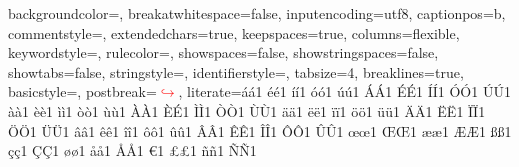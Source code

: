 
\lstset
{ 
  backgroundcolor=\color{white},        %
  breakatwhitespace=false,              %
  inputencoding=utf8,                   %
  captionpos=b,                         %
  commentstyle=\color{darkgreen},       %
  extendedchars=true,                   %
  keepspaces=true,                      %
  columns=flexible,                     %
  keywordstyle=\color{darkorange},      %
  rulecolor=\color{black},              %
  showspaces=false,                     %
  showstringspaces=false,               %
  showtabs=false,                       %
  stringstyle=\color{darkgreen},        %
  identifierstyle=\color{blue},         %
  tabsize=4,	                        %
  breaklines=true,                      %
  basicstyle=\footnotesize\ttfamily,    %
  postbreak=\mbox{\textcolor{red}{$\hookrightarrow$}\space}, %
  literate={á}{{\'a}}1 {é}{{\'e}}1 {í}{{\'i}}1 {ó}{{\'o}}1 {ú}{{\'u}}1 %
  {Á}{{\'A}}1 {É}{{\'E}}1 {Í}{{\'I}}1 {Ó}{{\'O}}1 {Ú}{{\'U}}1
  {à}{{\`a}}1 {è}{{\`e}}1 {ì}{{\`i}}1 {ò}{{\`o}}1 {ù}{{\`u}}1
  {À}{{\`A}}1 {È}{{\'E}}1 {Ì}{{\`I}}1 {Ò}{{\`O}}1 {Ù}{{\`U}}1
  {ä}{{\"a}}1 {ë}{{\"e}}1 {ï}{{\"i}}1 {ö}{{\"o}}1 {ü}{{\"u}}1
  {Ä}{{\"A}}1 {Ë}{{\"E}}1 {Ï}{{\"I}}1 {Ö}{{\"O}}1 {Ü}{{\"U}}1
  {â}{{\^a}}1 {ê}{{\^e}}1 {î}{{\^i}}1 {ô}{{\^o}}1 {û}{{\^u}}1
  {Â}{{\^A}}1 {Ê}{{\^E}}1 {Î}{{\^I}}1 {Ô}{{\^O}}1 {Û}{{\^U}}1
  {œ}{{\oe}}1 {Œ}{{\OE}}1 {æ}{{\ae}}1 {Æ}{{\AE}}1 {ß}{{\ss}}1
  {ç}{{\c c}}1 {Ç}{{\c C}}1 {ø}{{\o}}1 {å}{{\r a}}1 {Å}{{\r A}}1
  {€}{{\EUR}}1 {£}{{\pounds}}1 {ñ}{{\~n}}1 {Ñ}{{\~N}}1
}


